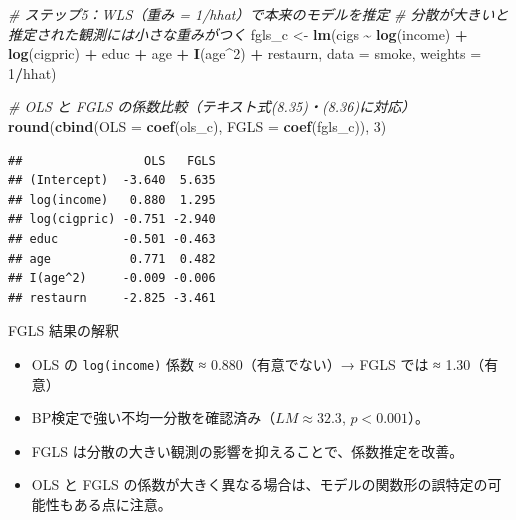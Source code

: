 \documentclass[
  ignorenonframetext,
]{beamer}
\newenvironment{Shaded}{\begin{snugshade}}{\end{snugshade}}
\newcommand{\AttributeTok}[1]{\textcolor[rgb]{0.13,0.29,0.53}{#1}}
\newcommand{\CommentTok}[1]{\textcolor[rgb]{0.56,0.35,0.01}{\textit{#1}}}
\newcommand{\DecValTok}[1]{\textcolor[rgb]{0.00,0.00,0.81}{#1}}
\newcommand{\FunctionTok}[1]{\textcolor[rgb]{0.13,0.29,0.53}{\textbf{#1}}}
\newcommand{\NormalTok}[1]{#1}
\newcommand{\OtherTok}[1]{\textcolor[rgb]{0.56,0.35,0.01}{#1}}
\newcommand{\SpecialCharTok}[1]{\textcolor[rgb]{0.81,0.36,0.00}{\textbf{#1}}}
\providecommand{\tightlist}{%
  \setlength{\itemsep}{0pt}\setlength{\parskip}{0pt}}
\begin{document}
\begin{frame}[fragile]
\footnotesize

\begin{Shaded}
\begin{Highlighting}[]
\CommentTok{\# ステップ5：WLS（重み = 1/hhat）で本来のモデルを推定}
\CommentTok{\# 分散が大きいと推定された観測には小さな重みがつく}
\NormalTok{fgls\_c }\OtherTok{\textless{}{-}} \FunctionTok{lm}\NormalTok{(cigs }\SpecialCharTok{\textasciitilde{}} \FunctionTok{log}\NormalTok{(income) }\SpecialCharTok{+} \FunctionTok{log}\NormalTok{(cigpric) }\SpecialCharTok{+}\NormalTok{ educ }\SpecialCharTok{+}
\NormalTok{               age }\SpecialCharTok{+} \FunctionTok{I}\NormalTok{(age}\SpecialCharTok{\^{}}\DecValTok{2}\NormalTok{) }\SpecialCharTok{+}\NormalTok{ restaurn,}
             \AttributeTok{data =}\NormalTok{ smoke, }\AttributeTok{weights =} \DecValTok{1}\SpecialCharTok{/}\NormalTok{hhat)}

\CommentTok{\# OLS と FGLS の係数比較（テキスト式(8.35)・(8.36)に対応）}
\FunctionTok{round}\NormalTok{(}\FunctionTok{cbind}\NormalTok{(}\AttributeTok{OLS  =} \FunctionTok{coef}\NormalTok{(ols\_c),}
            \AttributeTok{FGLS =} \FunctionTok{coef}\NormalTok{(fgls\_c)), }\DecValTok{3}\NormalTok{)}
\end{Highlighting}
\end{Shaded}

\begin{verbatim}
##                 OLS   FGLS
## (Intercept)  -3.640  5.635
## log(income)   0.880  1.295
## log(cigpric) -0.751 -2.940
## educ         -0.501 -0.463
## age           0.771  0.482
## I(age^2)     -0.009 -0.006
## restaurn     -2.825 -3.461
\end{verbatim}

\normalsize
\end{frame}

\begin{frame}[fragile]{FGLS 結果の解釈}
\label{fgls-ux7d50ux679cux306eux89e3ux91c8}
\begin{itemize}
\tightlist
\item
  OLS の \texttt{log(income)} 係数 ≈ 0.880（有意でない）→ FGLS では ≈
  1.30（有意）
\item
  BP検定で強い不均一分散を確認済み（\(LM \approx 32.3\),
  \(p < 0.001\)）。
\item
  FGLS は分散の大きい観測の影響を抑えることで、係数推定を改善。
\item
  OLS と FGLS
  の係数が大きく異なる場合は、モデルの関数形の誤特定の可能性もある点に注意。
\end{itemize}
\end{frame}
\end{document}
